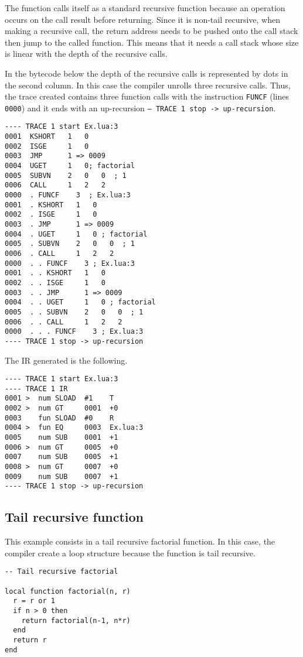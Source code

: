 \noindent
The function calls itself as a standard recursive function because an operation occurs on the call result before returning. Since it is non-tail recursive, when making a recursive call, the return address needs to be pushed onto the call stack then jump to the called function. This means that it needs a call stack whose size is linear with the depth of the recursive calls.

In the bytecode below the depth of the recursive calls is represented by dots in the second column. In this case the compiler unrolls three recursive calls. Thus, the trace created contains three function calls with the instruction \texttt{FUNCF} (lines \texttt{0000}) and it ends with an up-recursion \texttt{-- TRACE 1 stop -> up-recursion}.
\begin{multicols}{2}
\begin{lstlisting}[style=DumpStyle]
---- TRACE 1 start Ex.lua:3
0001  KSHORT   1   0
0002  ISGE     1   0
0003  JMP      1 => 0009
0004  UGET     1   0; factorial
0005  SUBVN    2   0   0  ; 1
0006  CALL     1   2   2
0000  . FUNCF    3  ; Ex.lua:3
0001  . KSHORT   1   0
0002  . ISGE     1   0
0003  . JMP      1 => 0009
0004  . UGET     1   0 ; factorial
0005  . SUBVN    2   0   0  ; 1
0006  . CALL     1   2   2
0000  . . FUNCF    3 ; Ex.lua:3
0001  . . KSHORT   1   0
0002  . . ISGE     1   0
0003  . . JMP      1 => 0009
0004  . . UGET     1   0 ; factorial
0005  . . SUBVN    2   0   0  ; 1
0006  . . CALL     1   2   2
0000  . . . FUNCF    3 ; Ex.lua:3
---- TRACE 1 stop -> up-recursion
\end{lstlisting}
\end{multicols}

\noindent
The IR generated is the following.

\begin{multicols}{2}
\begin{lstlisting}[style=DumpStyle]
---- TRACE 1 start Ex.lua:3
---- TRACE 1 IR
0001 >  num SLOAD  #1    T
0002 >  num GT     0001  +0  
0003    fun SLOAD  #0    R
0004 >  fun EQ     0003  Ex.lua:3
0005    num SUB    0001  +1  
0006 >  num GT     0005  +0  
0007    num SUB    0005  +1  
0008 >  num GT     0007  +0  
0009    num SUB    0007  +1  
---- TRACE 1 stop -> up-recursion
\end{lstlisting}
\end{multicols}

\subsection{Tail recursive function}
This example consists in a tail recursive factorial function. In this case, the compiler create a loop structure because the function is tail recursive.
\begin{mdframed}[style=LuaStyleFrame]
\begin{lstlisting}[style=LuaStyle]
-- Tail recursive factorial

local function factorial(n, r)
  r = r or 1
  if n > 0 then
    return factorial(n-1, n*r)
  end
  return r
end
\end{lstlisting}
\end{mdframed}

